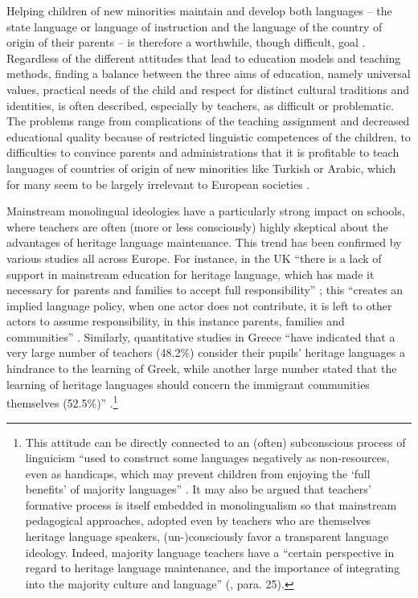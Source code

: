 \documentclass[output=paper,colorlinks,citecolor=brown]{langscibook}
\begin{document}
Helping children of new minorities maintain and develop both languages – the state language or language of instruction and the language of the country of origin of their parents – is therefore a worthwhile, though difficult, goal \citep{christensen_stanat2007}. Regardless of the different attitudes that lead to education models and teaching methods, finding a balance between the three aims of education, namely universal values, practical needs of the child and respect for distinct cultural traditions and identities, is often described, especially by teachers, as difficult or problematic. The problems range from complications of the teaching assignment and decreased educational quality because of restricted linguistic competences of the children, to difficulties to convince parents and administrations that it is profitable to teach languages of countries of origin of new minorities like Turkish or Arabic, which for many seem to be largely irrelevant to European societies \citep{decarlo2005}.

\largerpage[-1]
Mainstream monolingual ideologies have a particularly strong impact on schools, where teachers are often (more or less consciously) highly skeptical  about the advantages of heritage language maintenance. This trend has been confirmed by various studies all across Europe. For instance, in the UK ``there is a lack of support in mainstream education for heritage language, which has made it necessary for parents and families to accept full responsibility'' \citep{weekly2020}; this ``creates an implied language policy, when one actor does not contribute, it is left to other actors to assume responsibility, in this instance parents, families and communities'' \citep{weekly2020}. Similarly, quantitative studies in Greece ``have indicated that a very large number of teachers (48.2\%) consider their pupils' heritage languages a hindrance to the learning of Greek, while another large number stated that the learning of heritage languages should concern the immigrant communities themselves (52.5\%)'' \citep{gkaintartzi_kiliari_tsokalidou2015,acquistapace2014}.\footnote{This attitude can be directly connected to an (often) subconscious process of linguicism ``used to construct some languages negatively as non-resources, even as handicaps, which may prevent children from enjoying the `full benefits' of majority languages'' \citep{nic_craith2006}. It may also be argued that teachers' formative process is itself embedded in monolingualism so that mainstream pedagogical approaches, adopted even by teachers who are themselves heritage language speakers, (un-)consciously favor a transparent language ideology. Indeed, majority language teachers have a ``certain perspective in regard to heritage language maintenance, and the importance of integrating into the majority culture and language'' (\citealt{weekly2020}, para. 25).}
\end{document}
